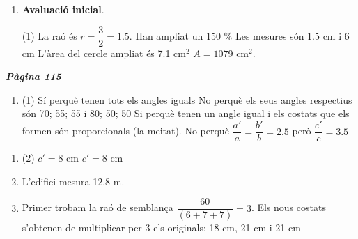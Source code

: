 \documentclass[a4paper, pdf, twoside]{book}
\begin{document}
\begin{multicols}{2}
\begin{enumerate}

 \item[$\bullet$ ] {\selectfont\color{blue}\textbf{Avaluació inicial}. } 
 \begin{tasks}[column-sep=1em, item-indent=1.3333em](1)
	 \task* La raó és $r=\dfrac {3}{2}=1.5$. Han ampliat un 150 \%
	 \task Les mesures són 1.5 cm i 6 cm
	 \task* L'àrea del cercle ampliat és 7.1 cm$^2$
	 \task $A=1079$ cm$^2$.
\end{tasks}
 \end{enumerate}
\vspace{0.3cm}


{\textbf{\em Pàgina 115}} \hrulefill
\begin{enumerate}
\vspace{0.25cm}



 \item[\fontfamily{phv}\selectfont\color{blue}\textbf{1}. ] 
 \begin{tasks}[column-sep=1em, item-indent=1.3333em](1)
	 \task* Sí perquè tenen tots els angles iguals
	 \task* No perquè els seus angles respectius són 70; 55; 55 i 80; 50; 50
	 \task* Si perquè tenen un angle igual i els costats que els formen són proporcionals (la meitat). No perquè $\dfrac {a'}{a} = \dfrac {b'}{b} = 2.5$ però $\dfrac {c'}{c} = 3.5$
\end{tasks}
 \end{enumerate}
\begin{enumerate}
\vspace{0.25cm}



 \item[\fontfamily{phv}\selectfont\color{blue}\textbf{2}. ] 
 \begin{tasks}[column-sep=1em, item-indent=1.3333em](2)
	 \task $c'=8$ cm
	 \task $c'=8$ cm
\end{tasks}
\vspace{0.25cm}
\item[\fontfamily{phv}\selectfont\color{blue}\textbf{3. }] 
L'edifici mesura 12.8 m.
\vspace{0.25cm}
\item[\fontfamily{phv}\selectfont\color{blue}\textbf{4. }] 
Primer trobam la raó de semblança $\dfrac {60}{(6+7+7)}=3$. Els nous costats s'obtenen de multiplicar per 3 els originals: 18 cm, 21 cm i 21 cm
 \end{enumerate}
\vspace{0.3cm}


\end{multicols}
\end{document}
